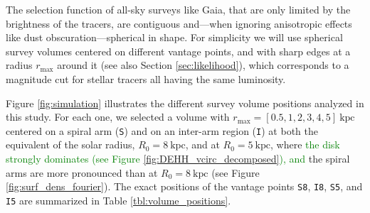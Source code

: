 \documentclass[iop,revtex4,numberedappendix,appendixfloats]{emulateapj}
\newcommand{\NEW}[1]{\textcolor{Green}{#1}}
\newcommand{\OLD}[1]{}
\begin{document}
The selection function of all-sky surveys like Gaia, that are only limited by the brightness of the tracers, are contiguous and---when ignoring anisotropic effects like dust obscuration---spherical in shape. For simplicity we will use spherical survey volumes centered on different vantage points, and with sharp edges at a radius $r_\text{max}$ around it (see also Section \ref{sec:likelihood}), which corresponds to a magnitude cut for stellar tracers all having the same luminosity. 

Figure \ref{fig:simulation} illustrates the different survey volume positions analyzed in this study. For each one, we selected a volume with $r_\text{max}=[0.5,1,2,3,4,5]~\text{kpc}$ centered on a spiral arm (\texttt{S}) and on an inter-arm region (\texttt{I}) at both the equivalent of the solar radius, $R_0=8~\text{kpc}$, and at $R_0=5~\text{kpc}$, where \NEW{the disk strongly dominates (see Figure \ref{fig:DEHH_vcirc_decomposed}), and} the spiral arms are more pronounced than at $R_0=8~\text{kpc}$ (see Figure \OLD{\ref{fig:spiral_arm_DeltaS}}\NEW{\ref{fig:surf_dens_fourier}}). The exact positions of the vantage points \texttt{S8}, \texttt{I8}, \texttt{S5}, and \texttt{I5} are summarized in Table \ref{tbl:volume_positions}.
\end{document}
